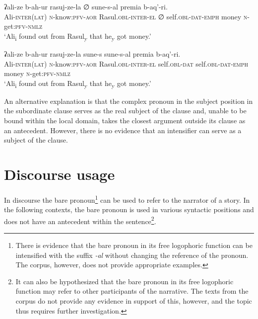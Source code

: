 ﻿\documentclass[output=paper]{langsci/langscibook}
\begin{document}
\ex %
\gll  ʡali-ze b-ah-ur rasuj-ze-la ∅ sune-s-al premia b-aq'-ri.\\
Ali-\textsc{inter}(\textsc{lat}) \textsc{n}-know:\textsc{pfv}-\textsc{aor} Rasul.\textsc{obl}-\textsc{inter}-\textsc{el} ∅ self.\textsc{obl}-\textsc{dat}-\textsc{emph} money \textsc{n}-get:\textsc{pfv}-\textsc{nmlz}\\ 
\glt `Ali\textsubscript{i} found out from Rasul\textsubscript{y} that
he\textsubscript{y} got money.'

\ex \label{ex:10:49} %
\gll  ʡali-ze b-ah-ur rasuj-ze-la sune-s sune-s-al premia b-aq'-ri.\\
Ali-\textsc{inter}(\textsc{lat}) \textsc{n}-know:\textsc{pfv}-\textsc{aor} Rasul.\textsc{obl}-\textsc{inter}-\textsc{el}  self.\textsc{obl}-\textsc{dat} self.\textsc{obl}-\textsc{dat}-\textsc{emph} money \textsc{n}-get:\textsc{pfv}-\textsc{nmlz}\\ 
\glt `Ali\textsubscript{i} found out from Rasul\textsubscript{y} that
he\textsubscript{y} got money.'
\z

An alternative explanation is that the complex pronoun in the subject
position in the subordinate clause serves as the real subject of the
clause and, unable to be bound within the local domain, takes the
closest argument outside its clause as an antecedent. However, there is
no evidence that an intensifier can serve as a subject of the clause.
%

\section{Discourse usage}\label{discourse-usage}

In discourse the bare pronoun\footnote{There is evidence that the bare
  pronoun in its free logophoric function can be intensified with the
  suffix \emph{-al} without changing the reference of the pronoun. The corpus,
  however, does not provide appropriate examples.} can be used to refer
to the narrator of a story. In the following contexts, the bare pronoun
is used in various syntactic positions and does not have an antecedent
within the sentence\footnote{It can also be hypothesized that the bare
  pronoun in its free logophoric function may refer to other
  participants of the narrative. The texts from the corpus do not
  provide any evidence in support of this, however, and the topic thus
  requires further investigation.}.

\end{document}
